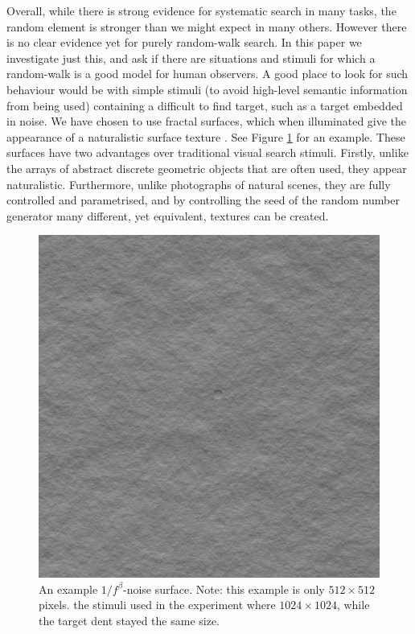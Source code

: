 \par
Overall, while there is strong evidence for systematic search in many tasks, the random element is stronger than we might expect in many others. However there is no clear evidence yet for purely random-walk search. In this paper we investigate just this, and ask if there are situations and stimuli for which a random-walk is a good model for human observers. A good place to look for such behaviour would be with simple stimuli (to avoid high-level semantic information from being used) containing a difficult to find target, such as a target embedded in noise. We have chosen to use fractal surfaces, which when illuminated give the appearance of a naturalistic surface texture \citep{clarke2008}. See Figure \ref{fig:smooth} for an example. These surfaces have two advantages over traditional visual search stimuli. Firstly, unlike the arrays of abstract discrete geometric objects that are often used, they appear naturalistic. Furthermore, unlike photographs of natural scenes, they are fully controlled and parametrised, and by controlling the seed of the random number generator many different, yet equivalent, textures can be created.
\par

\begin{figure}
	\centering
		\includegraphics[width=\textwidth, bb=0 0 1024 1024]{figures/smooth512.png}
		\caption{An example $1/f^{\beta}$-noise surface. Note: this example is only $512\times 512$ pixels. the stimuli used in the experiment where $1024\times 1024$, while the target dent stayed the same size.}
	\label{fig:smooth}
\end{figure}

